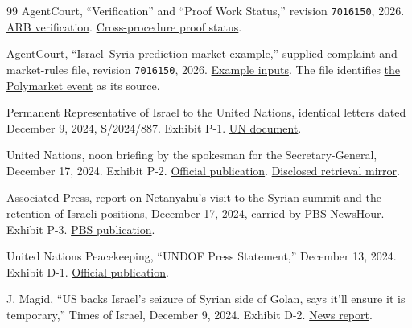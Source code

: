 \documentclass[11pt]{article}
\newcommand{\code}[1]{\texttt{#1}}
\begin{document}
\begin{thebibliography}{99}
AgentCourt, ``Verification'' and ``Proof Work Status,'' revision \code{7016150}, 2026.  \href{https://github.com/agentcourt/adj/blob/7016150f2ddc286e6079f1a99b616ac52d09057d/arb/docs/verification.md}{ARB verification}.  \href{https://github.com/agentcourt/adj/blob/7016150f2ddc286e6079f1a99b616ac52d09057d/docs/proof-notes.md}{Cross-procedure proof status}.

AgentCourt, ``Israel--Syria prediction-market example,'' supplied complaint and market-rules file, revision \code{7016150}, 2026.  \href{https://github.com/agentcourt/adj/tree/7016150f2ddc286e6079f1a99b616ac52d09057d/examples/ex04}{Example inputs}.  The file identifies \href{https://polymarket.com/event/will-israel-invade-syria-in-2024}{the Polymarket event} as its source.

Permanent Representative of Israel to the United Nations, identical letters dated December 9, 2024, S/2024/887.  Exhibit P-1.  \href{https://documents.un.org/doc/undoc/gen/n24/386/65/pdf/n2438665.pdf}{UN document}.

United Nations, noon briefing by the spokesman for the Secretary-General, December 17, 2024.  Exhibit P-2.  \href{https://press.un.org/en/2024/db241217.doc.htm}{Official publication}.  \href{https://www.globalsecurity.org/military/library/news/2024/12/mil-241217-unbrief01.htm}{Disclosed retrieval mirror}.

Associated Press, report on Netanyahu's visit to the Syrian summit and the retention of Israeli positions, December 17, 2024, carried by PBS NewsHour.  Exhibit P-3.  \href{https://www.pbs.org/newshour/world/netanyahu-enters-syrian-territory-to-tour-buffer-zone-seized-by-israel}{PBS publication}.

United Nations Peacekeeping, ``UNDOF Press Statement,'' December 13, 2024.  Exhibit D-1.  \href{https://peacekeeping.un.org/en/news/undof-press-statement}{Official publication}.

J. Magid, ``US backs Israel's seizure of Syrian side of Golan, says it'll ensure it is temporary,'' Times of Israel, December 9, 2024.  Exhibit D-2.  \href{https://www.timesofisrael.com/liveblog_entry/us-backs-israels-seizure-of-syrian-side-of-golan-says-itll-ensure-it-is-temporary/}{News report}.

\end{thebibliography}
\endgroup
\end{document}

